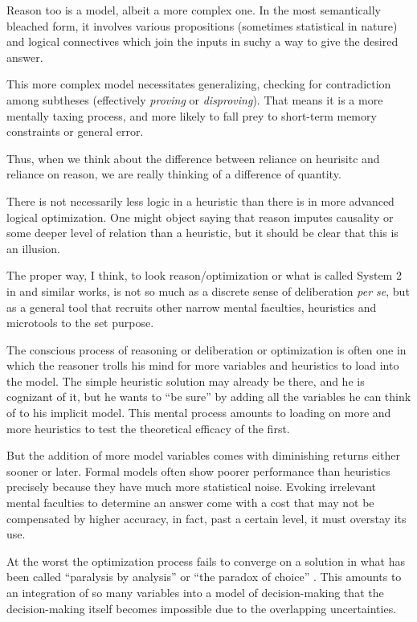 \documentclass{article}
\begin{document}
Reason too is a model, albeit a more complex one.
In the most semantically bleached form, it involves various propositions (sometimes statistical in nature) and logical connectives which join the inputs in suchy a way to give the desired answer.

This more complex model necessitates generalizing, checking for contradiction among subtheses (effectively \textit{proving} or \textit{disproving}).
That means it is a more mentally taxing process, and more likely to fall prey to short-term memory constraints or general error.

Thus, when we think about the difference between reliance on heurisitc and reliance on reason, we are really thinking of a difference of quantity.

There is not necessarily less logic in a heuristic than there is in more advanced logical optimization.
One might object saying that reason imputes causality or some deeper level of relation than a heuristic, but it should be clear that this is an illusion.

The proper way, I think, to look reason/optimization or what is called System 2 in \textcite{kahneman11} and similar works, is not so much as a discrete sense of deliberation \emph{per se}, but as a general tool that recruits other narrow mental faculties, heuristics and microtools to the set purpose.

The conscious process of reasoning or deliberation or optimization is often one in which the reasoner trolls his mind for more variables and heuristics to load into the model.
The simple heuristic solution may already be there, and he is cognizant of it, but he wants to ``be sure'' by adding all the variables he can think of to his implicit model.
This mental process amounts to loading on more and more heuristics to test the theoretical efficacy of the first.

But the addition of more model variables comes with diminishing returns either sooner or later.
Formal models often show poorer performance than heuristics precisely because they have much more statistical noise.
Evoking irrelevant mental faculties to determine an answer come with a cost that may not be compensated by higher accuracy, in fact, past a certain level, it must overstay its use.

At the worst the optimization process fails to converge on a solution in what has been called ``paralysis by analysis'' or ``the paradox of choice'' \parencite{schwartz04}.
This amounts to an integration of so many variables into a model of decision-making that the decision-making itself becomes impossible due to the overlapping uncertainties.
\end{document}
